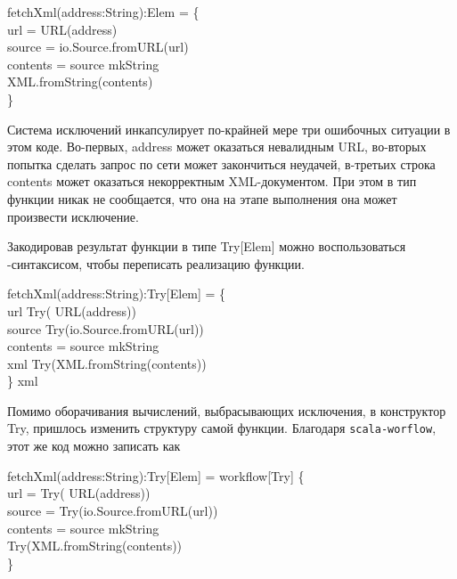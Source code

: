 \begin{haskell}
 fetchXml(address:String):Elem = \{ \\
\quad\quad {} url =  URL(address) \\
\quad\quad {} source = io.Source.fromURL(url) \\
\quad\quad {} contents = source mkString \hsstr{} \\
\quad\quad XML.fromString(contents) \\
\}
\end{haskell}

Система исключений инкапсулирует по-крайней мере три ошибочных ситуации в этом коде. Во-первых, \<address\> может оказаться невалидным URL, во-вторых попытка сделать запрос по сети может закончиться неудачей, в-третьих строка \<contents\> может оказаться некорректным XML-документом. При этом в тип функции никак не сообщается, что она на этапе выполнения она может произвести исключение.

Закодировав результат функции в типе \<Try[Elem]\> можно воспользоваться \<\>-синтаксисом, чтобы переписать реализацию функции.

\begin{haskell}
 fetchXml(address:String):Try[Elem] =  \{ \\
\quad\quad url \hsfrom Try( URL(address)) \\
\quad\quad source \hsfrom Try(io.Source.fromURL(url)) \\
\quad\quad contents = source mkString \hsstr{} \\
\quad\quad xml \hsfrom Try(XML.fromString(contents)) \\
\}  xml
\end{haskell}

Помимо оборачивания вычислений, выбрасывающих исключения, в конструктор \<Try\>, пришлось изменить структуру самой функции. Благодаря \texttt{scala-worflow}, этот же код можно записать как

\begin{haskell}
 fetchXml(address:String):Try[Elem] = workflow[Try] \{ \\
\quad\quad {} url = Try( URL(address)) \\
\quad\quad {} source = Try(io.Source.fromURL(url)) \\
\quad\quad {} contents = source mkString \hsstr{} \\
\quad\quad Try(XML.fromString(contents)) \\
\}
\end{haskell}

